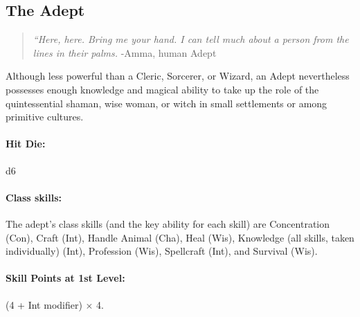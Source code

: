 \subsection[Adept]{The Adept}
\label{sec:Adept}
\begin{quote}
\emph{``Here, here. Bring me your hand. I can tell much about a person from the lines in their palms.}
-Amma, human Adept
\end{quote}

Although less powerful than a Cleric, Sorcerer, or Wizard, an Adept nevertheless possesses enough knowledge and magical ability to take up the role of the quintessential shaman, wise woman, or witch in small settlements or among primitive cultures.
\paragraph{Hit Die:} d6
\paragraph{Class skills:}
The adept's class skills (and the key ability for each skill) are Concentration (Con), Craft (Int), Handle Animal (Cha), Heal (Wis), Knowledge (all skills, taken individually) (Int), Profession (Wis), Spellcraft (Int), and Survival (Wis).

\paragraph{Skill Points at 1st Level:} (4 + Int modifier) $\times$ 4.
